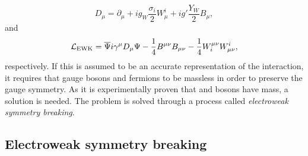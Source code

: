 \begin{equation}
D_{\mu} = \partial_{\mu}+ig_{W}\frac{\sigma_{i}}{2}W_{\mu}^{i}+ig'\frac{Y_{W}}{2}B_{\mu},
\end{equation}
and
\begin{equation}
\mathcal{L}_{\mathrm{EWK}}=\overline{\Psi}i\gamma^{\mu}D_{\mu}\Psi - \frac{1}{4}B^{\mu\nu}B_{\mu\nu} - \frac{1}{4}W^{\mu\nu}_{i}W_{\mu\nu}^{i},
\end{equation}
respectively.
If this is assumed to be an accurate representation of the \EWK{} interaction, it requires that gauge bosons and fermions to be massless in order to preserve the gauge symmetry.
As it is experimentally proven that \Wboson{} and \Zboson{} bosons have mass, a solution is needed.
The problem is solved through a process called \textit{electroweak symmetry breaking}.

\subsection{Electroweak symmetry breaking} %
\label{sub:electroweak_symmetry_breaking}

